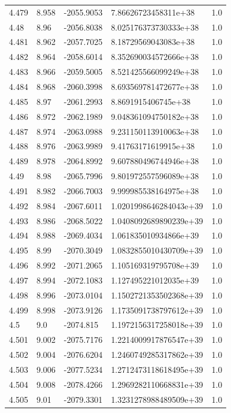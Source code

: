 \begin{tabular}{lllll}
4.479 & 8.958 & -2055.9053 & 7.86626723458311e+38 & 1.0 \\
4.48 & 8.96 & -2056.8038 & 8.025176373730333e+38 & 1.0 \\
4.481 & 8.962 & -2057.7025 & 8.18729569043083e+38 & 1.0 \\
4.482 & 8.964 & -2058.6014 & 8.352690034572666e+38 & 1.0 \\
4.483 & 8.966 & -2059.5005 & 8.521425566099249e+38 & 1.0 \\
4.484 & 8.968 & -2060.3998 & 8.693569781472677e+38 & 1.0 \\
4.485 & 8.97 & -2061.2993 & 8.8691915406745e+38 & 1.0 \\
4.486 & 8.972 & -2062.1989 & 9.048361094750182e+38 & 1.0 \\
4.487 & 8.974 & -2063.0988 & 9.231150113910063e+38 & 1.0 \\
4.488 & 8.976 & -2063.9989 & 9.41763171619915e+38 & 1.0 \\
4.489 & 8.978 & -2064.8992 & 9.607880496744946e+38 & 1.0 \\
4.49 & 8.98 & -2065.7996 & 9.801972557596089e+38 & 1.0 \\
4.491 & 8.982 & -2066.7003 & 9.999985538164975e+38 & 1.0 \\
4.492 & 8.984 & -2067.6011 & 1.0201998646284043e+39 & 1.0 \\
4.493 & 8.986 & -2068.5022 & 1.0408092689890239e+39 & 1.0 \\
4.494 & 8.988 & -2069.4034 & 1.061835010934866e+39 & 1.0 \\
4.495 & 8.99 & -2070.3049 & 1.0832855010430709e+39 & 1.0 \\
4.496 & 8.992 & -2071.2065 & 1.105169319795708e+39 & 1.0 \\
4.497 & 8.994 & -2072.1083 & 1.127495221012035e+39 & 1.0 \\
4.498 & 8.996 & -2073.0104 & 1.1502721353502368e+39 & 1.0 \\
4.499 & 8.998 & -2073.9126 & 1.1735091738797612e+39 & 1.0 \\
4.5 & 9.0 & -2074.815 & 1.1972156317258018e+39 & 1.0 \\
4.501 & 9.002 & -2075.7176 & 1.2214009917876547e+39 & 1.0 \\
4.502 & 9.004 & -2076.6204 & 1.2460749285317862e+39 & 1.0 \\
4.503 & 9.006 & -2077.5234 & 1.2712473118618495e+39 & 1.0 \\
4.504 & 9.008 & -2078.4266 & 1.2969282110668831e+39 & 1.0 \\
4.505 & 9.01 & -2079.3301 & 1.3231278988489509e+39 & 1.0 \\

\end{tabular}

